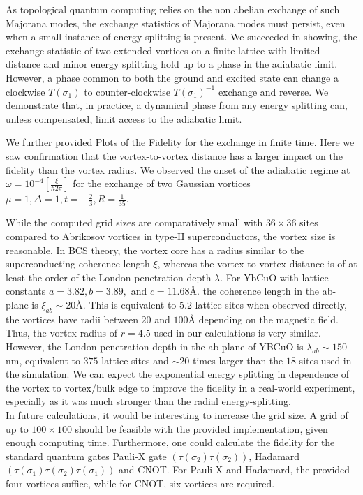 \documentclass[Master]{subfiles}
\begin{document}
As topological quantum computing relies on the non abelian exchange of such Majorana modes, the exchange statistics of Majorana modes must persist, even when a small instance of energy-splitting is present. We succeeded in showing, the exchange statistic of two extended vortices on a finite lattice with limited distance and minor energy splitting hold up to a phase in the adiabatic limit. However, a phase common to both the ground and excited state can change a clockwise $T(\sigma_1)$  to counter-clockwise $T(\sigma_1)^{-1}$  exchange and reverse. We demonstrate that, in practice, a dynamical phase from any energy splitting can, unless compensated,  limit access to the adiabatic limit.

We further provided Plots of the Fidelity for the exchange in finite time. Here we saw confirmation that the vortex-to-vortex distance has a larger impact on the fidelity than the vortex radius. We observed the onset of the adiabatic regime at $\omega = 10^{-4} [\frac{\xi}{\hbar 2 \pi}]$  for the exchange of two Gaussian vortices $\mu = 1, \Delta = 1, t = -\frac{2}{3}, R = \frac{1}{35}$.

While the computed grid sizes are comparatively small with $36 \times 36$ sites compared to Abrikosov vortices in type-II superconductors, the vortex size is reasonable. In BCS theory, the vortex core has a radius similar to the superconducting coherence length $\xi$, whereas the vortex-to-vortex distance is of at least the order of the London penetration depth $\lambda$. For YbCuO with lattice constants $a = 3.82, b = 3.89,$ and $c = 11.68 \si{\angstrom}.$ the coherence length in the ab-plane is $\xi_{ab}  \sim 20 \si{\angstrom}.$  This is equivalent to $5.2$ lattice sites when observed directly, the vortices have radii between $20$ and $100 \si{\angstrom}$ \cite{sonier2004investigations} depending on the magnetic field. Thus, the vortex radius of $r = 4.5$ used in our calculations is very similar. However, the London penetration depth in the ab-plane of YBCuO is $\lambda_{ab} \sim150$ nm, equivalent to $375$ lattice sites and $\sim20$ times larger than the $18$ sites used in the simulation. We can expect the exponential energy splitting in dependence of the vortex to vortex/bulk edge to improve the fidelity in a real-world experiment, especially as it was much stronger than the radial energy-splitting.\\
In future calculations, it would be interesting to increase the grid size. A grid of up to $100\times100$ should be feasible with the provided implementation, given enough computing time. Furthermore, one could calculate the fidelity for the standard quantum gates Pauli-X gate $(\tau(\sigma_2)\tau(\sigma_2))$, Hadamard $(\tau(\sigma_1)\tau(\sigma_2)\tau(\sigma_1))$ and CNOT. For Pauli-X and Hadamard, the provided four vortices suffice, while for CNOT, six vortices are required.
\end{document}
